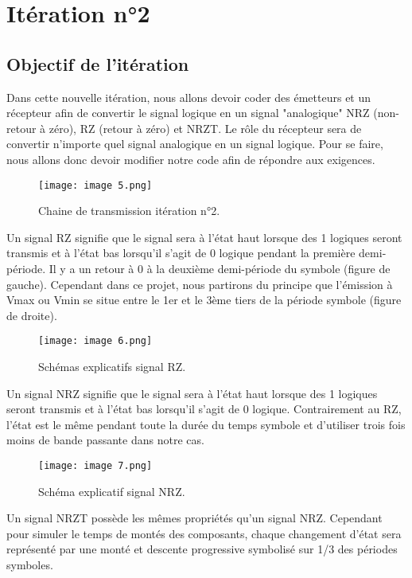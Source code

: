 \section{Itération n°2}
\subsection{Objectif de l'itération}

Dans cette nouvelle itération, nous allons devoir coder des émetteurs et un récepteur afin de convertir le signal logique en un signal "analogique" NRZ (non-retour à zéro), RZ (retour à zéro) et NRZT. Le rôle du récepteur sera de convertir n'importe quel signal analogique en un signal logique. Pour se faire, nous allons donc devoir modifier notre code afin de répondre aux exigences.

\begin{figure}[H]
    \centering
    \texttt{[image: image 5.png]}
    \caption{\label{fig:image5}Chaine de transmission itération n°2.}
\end{figure}

Un signal RZ signifie que le signal sera à l'état haut lorsque des 1 logiques seront transmis et à l'état bas lorsqu'il s'agit de 0 logique pendant la première demi-période. Il y a un retour à 0 à la deuxième demi-période du symbole (figure de gauche). Cependant dans ce projet, nous partirons du principe que l'émission à Vmax ou Vmin se situe entre le 1er et le 3ème tiers de la période symbole (figure de droite).

\begin{figure}[H]
    \centering
    \texttt{[image: image 6.png]}
    \caption{\label{fig:image6}Schémas explicatifs signal RZ.}
\end{figure}

Un signal NRZ signifie que le signal sera à l'état haut lorsque des 1 logiques seront transmis et à l'état bas lorsqu'il s'agit de 0 logique. Contrairement au RZ, l'état est le même pendant toute la durée du temps symbole et d'utiliser trois fois moins de bande passante dans notre cas.

\begin{figure}[H]
    \centering
    \texttt{[image: image 7.png]}
    \caption{\label{fig:image7}Schéma explicatif signal NRZ.}
\end{figure}

Un signal NRZT possède les mêmes propriétés qu'un signal NRZ. Cependant pour simuler le temps de montés des composants, chaque changement d'état sera représenté par une monté et descente progressive symbolisé sur 1/3 des périodes symboles.

